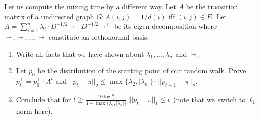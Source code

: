 \begin{problem}[30 points]
\begin{enumerate}
  
\end{enumerate}

\end{problem}

\begin{problem}[40 points] Let us compute the mixing time by a different way. Let $A$ be the transition matrix of a undirected graph $G: A(i, j) = 1/d(i) \text{\ iff\ }(i, j) \in E$. Let $A = \sum_{i=1}^{n}\lambda_i\cdot D^{-1/2}\mathop{v_{i}}\limits ^{\rightarrow}\cdot D^{-1/2}{\mathop{v_{i}}\limits ^{\rightarrow}}^\top$ be its eigen-decomposition where $\mathop{v_{1}}\limits ^{\rightarrow},\mathop{v_{2}}\limits ^{\rightarrow},...,\mathop{v_{n}}\limits ^{\rightarrow}$ constitute an orthonormal basis.
\end{problem}
\begin{enumerate}
	\item Write all facts that we have shown about $\lambda_1,...,\lambda_n$ and $\mathop{u_{1}}\limits^{\rightarrow}$.
	\item Let $p_0$ be the distribution of the starting point of our random walk. Prove $p_t^\top=p_0^\top\cdot A^t$ and $||p_t - \pi||_2 \le \max\{\lambda_2,|\lambda_n|\}\cdot||p_{t-1}-\pi||_2$.
	\item Conclude that for $t\ge\frac{10\log{\frac{n}{\epsilon}}}{1-\max\{\lambda_2,|\lambda_n|\}}$,$||p_t-\pi||_1\le\epsilon$ (note that we switch to $\ell_1$ norm here).
\end{enumerate}

